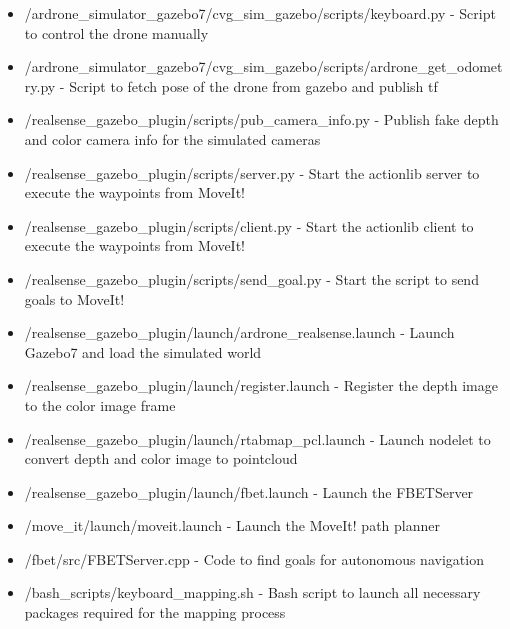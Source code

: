 \documentclass[a4paper,12pt,oneside]{book}
\begin{document}
\begin{itemize}

	\item /ardrone\_simulator\_gazebo7/cvg\_sim\_gazebo/scripts/keyboard.py - Script to control the drone manually
	
	\item /ardrone\_simulator\_gazebo7/cvg\_sim\_gazebo/scripts/ardrone\_get\_odometry.py - Script to fetch pose of the drone from gazebo and publish tf
	
	\item /realsense\_gazebo\_plugin/scripts/pub\_camera\_info.py - Publish fake depth and color camera info for the simulated cameras
	
	\item /realsense\_gazebo\_plugin/scripts/server.py - Start the actionlib server to execute the waypoints from MoveIt!
	
	\item /realsense\_gazebo\_plugin/scripts/client.py - Start the actionlib client to execute the waypoints from MoveIt!
	
	\item /realsense\_gazebo\_plugin/scripts/send\_goal.py - Start the script to send goals to MoveIt!
	
	\item /realsense\_gazebo\_plugin/launch/ardrone\_realsense.launch - Launch Gazebo7 and load the simulated world
	
	\item /realsense\_gazebo\_plugin/launch/register.launch - Register the depth image to the color image frame
	
	\item /realsense\_gazebo\_plugin/launch/rtabmap\_pcl.launch - Launch nodelet to convert depth and color image to pointcloud
	
	\item /realsense\_gazebo\_plugin/launch/fbet.launch - Launch the FBETServer
	
	\item /move\_it/launch/moveit.launch - Launch the MoveIt! path planner
	
	\item /fbet/src/FBETServer.cpp - Code to find goals for autonomous navigation	
	
	\item /bash\_scripts/keyboard\_mapping.sh - Bash script to launch all necessary packages required for the mapping process
	
\end{itemize}
\end{document}
